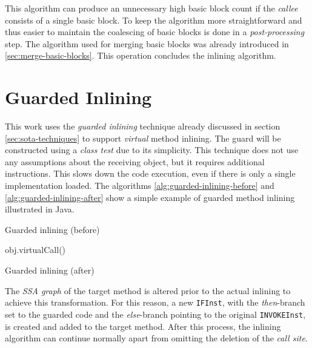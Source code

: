\documentclass[draft, final]{vutinfth} %
\begin{document}
This algorithm can produce an unnecessary high basic block count if the \emph{callee} consists of a single basic block. To keep the algorithm more straightforward and thus easier to maintain the coalescing of basic blocks is done in a \emph{post-processing} step. The algorithm used for merging basic blocks was already introduced in \ref{sec:merge-basic-blocks}. This operation concludes the inlining algorithm.

\section{Guarded Inlining}
\label{sec:guarded}

This work uses the \emph{guarded inlining} technique already discussed in section \ref{sec:sota-techniques} to support \emph{virtual} method inlining. The guard will be constructed using a \emph{class test} due to its simplicity. This technique does not use any assumptions about the receiving object, but it requires additional instructions. This slows down the code execution, even if there is only a single implementation loaded. The algorithms \ref{alg:guarded-inlining-before} and \ref{alg:guarded-inlining-after} show a simple example of guarded method inlining illustrated in Java.

\begin{algorithm}[H]
\caption{Guarded inlining (before)}
\label{alg:guarded-inlining-before}
obj.virtualCall()
\end{algorithm}

\begin{algorithm}[H]
\caption{Guarded inlining (after)}
\label{alg:guarded-inlining-after}
\end{algorithm}

The \emph{SSA graph} of the target method is altered prior to the actual inlining to achieve this transformation. For this reason, a new \texttt{IFInst}, with the \emph{then}-branch set to the guarded code and the \emph{else}-branch pointing to the original \texttt{INVOKEInst}, is created and added to the target method. After this process, the inlining algorithm can continue normally apart from omitting the deletion of the \emph{call site}.
\end{document}
